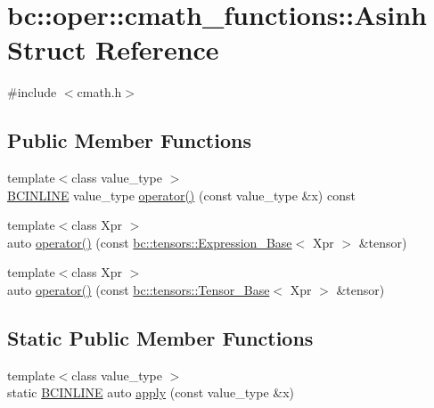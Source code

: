 \hypertarget{structbc_1_1oper_1_1cmath__functions_1_1Asinh}{}\section{bc\+:\+:oper\+:\+:cmath\+\_\+functions\+:\+:Asinh Struct Reference}
\label{structbc_1_1oper_1_1cmath__functions_1_1Asinh}


{\ttfamily \#include $<$cmath.\+h$>$}

\subsection*{Public Member Functions}
\begin{DoxyCompactItemize}
\item 
{\footnotesize template$<$class value\+\_\+type $>$ }\\\hyperlink{common_8h_a6699e8b0449da5c0fafb878e59c1d4b1}{B\+C\+I\+N\+L\+I\+NE} value\+\_\+type \hyperlink{structbc_1_1oper_1_1cmath__functions_1_1Asinh_ab6227d0033e0c9c447e17e8bfa4093d5}{operator()} (const value\+\_\+type \&x) const
\item 
{\footnotesize template$<$class Xpr $>$ }\\auto \hyperlink{structbc_1_1oper_1_1cmath__functions_1_1Asinh_af1edd2d7145261551a34401ec4a6c14d}{operator()} (const \hyperlink{classbc_1_1tensors_1_1Expression__Base}{bc\+::tensors\+::\+Expression\+\_\+\+Base}$<$ Xpr $>$ \&tensor)
\item 
{\footnotesize template$<$class Xpr $>$ }\\auto \hyperlink{structbc_1_1oper_1_1cmath__functions_1_1Asinh_aa88f33581a4f1bc627091ff9e06fbc02}{operator()} (const \hyperlink{classbc_1_1tensors_1_1Tensor__Base}{bc\+::tensors\+::\+Tensor\+\_\+\+Base}$<$ Xpr $>$ \&tensor)
\end{DoxyCompactItemize}
\subsection*{Static Public Member Functions}
\begin{DoxyCompactItemize}
\item 
{\footnotesize template$<$class value\+\_\+type $>$ }\\static \hyperlink{common_8h_a6699e8b0449da5c0fafb878e59c1d4b1}{B\+C\+I\+N\+L\+I\+NE} auto \hyperlink{structbc_1_1oper_1_1cmath__functions_1_1Asinh_ab65c46cf8a69539fff1a71b9ec1f4e8a}{apply} (const value\+\_\+type \&x)
\end{DoxyCompactItemize}


